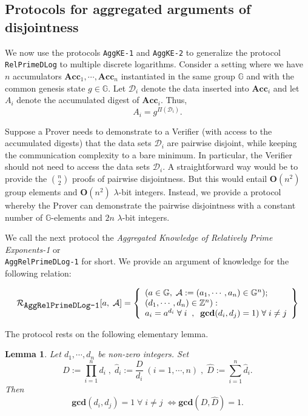\documentclass[11pt, lettersize, notitlepage, leqno, footskip=0.6cm]{article}
\newcommand{\bz}{\mathbb Z}
\newcommand{\pl}{\prod\limits}
\newcommand{\slim}{\sum\limits}
\newcommand{\Acc}{\mbf{Acc}}
\newcommand{\LRA}{\Longleftrightarrow}
\newcommand{\mc}{\mathcal}
\newcommand{\mb}{\mathbb}
\newcommand{\mbf}{\mathbf}
\newcommand{\lam}{\lambda}
\newcommand{\what}{\widehat}
\newcommand{\vs}{\vspace{-0.15cm}}
\newcommand{\noin}{\noindent}
\newcommand{\GCD}{\mbf{gcd}}
\newtheorem{Lem}[Thm]{Lemma}
\numberwithin{equation}{section}
\begin{document}
\subsection{\fontsize{11}{11}\selectfont Protocols for aggregated arguments of disjointness}

We now use the protocols \verb|AggKE-1| and \verb|AggKE-2| to generalize the protocol \verb|RelPrimeDLog| to multiple discrete logarithms. Consider a setting where we have $n$ accumulators $\Acc_1,\cdots,\Acc_n$ instantiated in the same group $\mb{G}$ and with the common genesis state $g\in\mb{G}$. Let $\mc{D}_i$ denote the data inserted into $\Acc_i$ and let $A_i$ denote the accumulated digest of $\Acc_i$. Thus, \vs $$A_i = g^{\Pi(\mc{D}_i)} .$$ 

Suppose a Prover needs to demonstrate to a Verifier (with access to the accumulated digests) that the data sets $\mc{D}_i$ are pairwise disjoint, while keeping the communication complexity to a bare minimum. In particular, the Verifier should not need to access the data sets $\mc{D}_i$. A straightforward way would be to provide the $n\choose 2$ proofs of pairwise disjointness. But this would entail $\mbf{O}(n^2)$ group elements and $\mbf{O}(n^2)$ $\lam$-bit integers. Instead, we provide a protocol whereby the Prover can demonstrate the pairwise disjointness with a constant number of $\mb{G}$-elements and $2n$ $\lam$-bit integers.

We call the next protocol the \textit{Aggregated Knowledge of Relatively Prime Exponents-1} or\\ \verb|AggRelPrimeDLog-1| for short. We provide an argument of knowledge for the following relation:

\[
  \mc{R}_{{\protect\verb|AggRelPrimeDLog-1|}}[a,\; \mc{A}] = \left\{\begin{array}{l}
    (a\in\mb{G},\;  \mc{A}:=(a_1,\cdots, a_n)\in\mb{G}^n);\\
    (d_1,\cdots,d_n)\in\bz^n): \\
    a_i = a^{d_i}\;\forall\;i\;\;,\;\; \GCD(d_i, d_j) = 1)\;\forall \;i\neq j   	
  \end{array}\right\}
\] 

\noin The protocol rests on the following elementary lemma.

\begin{Lem}\label{lcm} Let $d_1,\cdots,d_n$ be non-zero integers. Set \vs $$D:= \pl_{i=1}^n d_i\;,\; \what{d}_i:= \frac{D}{d_i}\;(i=1,\cdots,n) \;,\;\what{D}:= \slim_{i=1}^n \what{d}_i.$$ Then \vs $$\GCD(d_i,d_j)=1\;\forall\;i\neq j\; \LRA \GCD(D, \what{D}) = 1 .$$\end{Lem}
\end{document}
